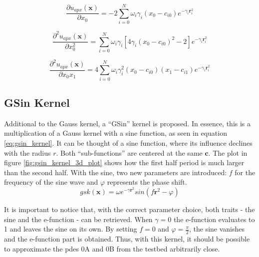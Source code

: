 \documentclass[./\jobname.tex]{subfiles}
\begin{document}
\begin{equation}
\label{eq:uapx_gauss_kernel_x0}
\frac{\partial u_{apx}(\mathbf{x})}{\partial x_0} = -2 \sum_{i=0}^{N} \omega_i \gamma_i (x_0 - c_{i0}) e^{-\gamma_i \mathbf{r}_i^2}
\end{equation}

\begin{equation}
\label{eq:uapx_gauss_kernel_x0x0}
\frac{\partial^2 u_{apx}(\mathbf{x})}{\partial x_0^2} = \sum_{i=0}^{N} \omega_i \gamma_i \left[ 4 \gamma_i (x_0 - c_{i0})^2 - 2 \right] e^{-\gamma_i \mathbf{r}_i^2}
\end{equation}

\begin{equation}
\label{eq:uapx_gauss_kernel_x0x1}
\frac{\partial^2 u_{apx}(\mathbf{x})}{\partial x_0 x_1} = 4 \sum_{i=0}^{N} \omega_i \gamma_i^2 (x_0 - c_{i0}) (x_1 - c_{i1}) e^{-\gamma_i \mathbf{r}_i^2} 
\end{equation}

\subsection{GSin Kernel}
\label{chap:gsin_kernel}
Additional to the Gauss kernel, a ``GSin'' kernel is proposed. In essence, this is a multiplication of a Gauss kernel with a sine function, as seen in equation \ref{eq:gsin_kernel}. It can be thought of a sine function, where its influence declines with the radius $r$. Both ``sub-functions'' are centered at the same $\mathbf{c}$. 
The plot in figure \ref{fig:gsin_kernel_3d_plot} shows how the first half period is much larger than the second half. With the sine, two new parameters are introduced: $f$ for the frequency of the sine wave and $\varphi$ represents the phase shift. 
\begin{equation}
\label{eq:gsin_kernel}
gsk(\mathbf{x}) = \omega e^{-\gamma \mathbf{r}^2} sin(f \mathbf{r}^2 - \varphi)
\end{equation}

It is important to notice that, with the correct parameter choice, both traits - the sine and the e-function - can be retrieved. When $\gamma=0$ the e-function evaluates to 1 and leaves the sine on its own. By setting $f=0$ and $\varphi=\frac{\pi}{2}$, the sine vanishes and the e-function part is obtained. Thus, with this kernel, it should be possible to approximate the \gls{pde}s 0A and 0B from the testbed arbitrarily close. 
\end{document}
